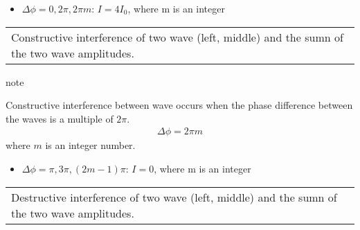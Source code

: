 \documentclass[letterpaper,10pt,english]{sphinxmanual}
\begin{document}
\begin{itemize}
\item {} 
\(\Delta \phi=0,2\pi,2\pi m\): \(I=4I_{0}\), where m is an integer

\end{itemize}


\begin{savenotes}\sphinxattablestart
\centering
\begin{tabulary}{\linewidth}[t]{|T|}
\hline
\sphinxstyletheadfamily 
{}  
\\
\hline
{} Constructive interference of two wave (left, middle) and the sumn of the two wave amplitudes.
\\
\hline
\end{tabulary}
\par
\sphinxattableend\end{savenotes}

\begin{sphinxadmonition}{note}{}\unskip
{}

Constructive interference between wave occurs when the phase difference between the waves is a multiple of \(2\pi\).
\begin{equation*}
\begin{split}\Delta \phi=2\pi m\end{split}
\end{equation*}
where \(m\) is an integer number.
\end{sphinxadmonition}

\begin{itemize}
\item {} 
\(\Delta \phi=\pi,3\pi,(2m-1)\pi\): \(I=0\), where m is an integer

\end{itemize}


\begin{savenotes}\sphinxattablestart
\centering
\begin{tabulary}{\linewidth}[t]{|T|}
\hline
\sphinxstyletheadfamily 
{}  
\\
\hline
{} Destructive interference of two wave (left, middle) and the sumn of the two wave amplitudes.
\\
\hline
\end{tabulary}
\par
\sphinxattableend\end{savenotes}
\end{document}
